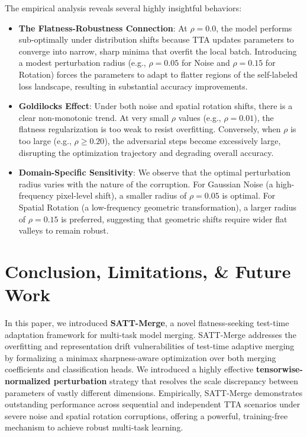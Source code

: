 \documentclass{article}
\begin{document}
The empirical analysis reveals several highly insightful behaviors:
\begin{itemize}
    \item \textbf{The Flatness-Robustness Connection}: At $\rho=0.0$, the model performs sub-optimally under distribution shifts because TTA updates parameters to converge into narrow, sharp minima that overfit the local batch. Introducing a modest perturbation radius (e.g., $\rho=0.05$ for Noise and $\rho=0.15$ for Rotation) forces the parameters to adapt to flatter regions of the self-labeled loss landscape, resulting in substantial accuracy improvements.
    \item \textbf{Goldilocks Effect}: Under both noise and spatial rotation shifts, there is a clear non-monotonic trend. At very small $\rho$ values (e.g., $\rho=0.01$), the flatness regularization is too weak to resist overfitting. Conversely, when $\rho$ is too large (e.g., $\rho \ge 0.20$), the adversarial steps become excessively large, disrupting the optimization trajectory and degrading overall accuracy.
    \item \textbf{Domain-Specific Sensitivity}: We observe that the optimal perturbation radius varies with the nature of the corruption. For Gaussian Noise (a high-frequency pixel-level shift), a smaller radius of $\rho=0.05$ is optimal. For Spatial Rotation (a low-frequency geometric transformation), a larger radius of $\rho=0.15$ is preferred, suggesting that geometric shifts require wider flat valleys to remain robust.
\end{itemize}

\section{Conclusion, Limitations, \& Future Work}
\label{sec:conclusion}

In this paper, we introduced \textbf{SATT-Merge}, a novel flatness-seeking test-time adaptation framework for multi-task model merging. SATT-Merge addresses the overfitting and representation drift vulnerabilities of test-time adaptive merging by formalizing a minimax sharpness-aware optimization over both merging coefficients and classification heads. We introduced a highly effective \textbf{tensorwise-normalized perturbation} strategy that resolves the scale discrepancy between parameters of vastly different dimensions. Empirically, SATT-Merge demonstrates outstanding performance across sequential and independent TTA scenarios under severe noise and spatial rotation corruptions, offering a powerful, training-free mechanism to achieve robust multi-task learning.
\end{document}
